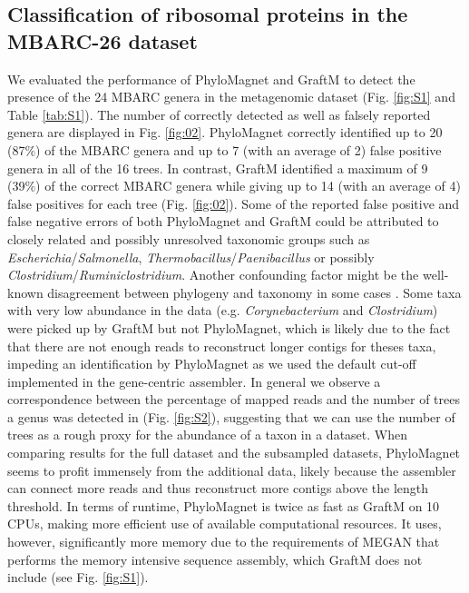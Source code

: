 \documentclass{bioinfo}
\begin{document}
\subsection{Classification of ribosomal proteins in the MBARC-26 dataset}

We evaluated the performance of PhyloMagnet and GraftM to detect the presence of the 24 MBARC genera \citep[23 of those detectable, as Nocardiopsis was part of the pooled community but not present in the sequence data from][]{Singer2016} in the metagenomic dataset (Fig. \ref{fig:S1} and Table \ref{tab:S1}). The number of correctly detected as well as falsely reported genera are displayed in Fig. \ref{fig:02}. PhyloMagnet correctly identified up to 20 (87\%) of the MBARC genera and up to 7 (with an average of 2) false positive genera in all of the 16 trees. In contrast, GraftM identified a maximum of 9 (39\%) of the correct MBARC genera while giving up to 14 (with an average of 4) false positives for each tree (Fig. \ref{fig:02}). Some of the reported false positive and false negative errors of both PhyloMagnet and GraftM could be attributed to closely related and possibly unresolved taxonomic groups such as \textit{Escherichia}/\textit{Salmonella}, \textit{Thermobacillus}/\textit{Paenibacillus} or possibly \textit{Clostridium}/\textit{Ruminiclostridium}. Another confounding factor might be the well-known disagreement between phylogeny and taxonomy in some cases \citep[e.g. \textit{Escherichia}/\textit{Salmonella};][]{Retchless2010}.  Some taxa with very low abundance in the data (e.g. \textit{Corynebacterium} and \textit{Clostridium}) were picked up by GraftM but not PhyloMagnet, which is likely due to the fact that there are not enough reads to reconstruct longer contigs for theses taxa, impeding an identification by PhyloMagnet as we used the default cut-off implemented in the gene-centric assembler. In general we observe a correspondence between the percentage of mapped reads \citep{Singer2016} and the number of trees a genus was detected in (Fig. \ref{fig:S2}), suggesting that we can use the number of trees as a rough proxy for the abundance of a taxon in a dataset.  
When comparing results for the full dataset and the subsampled datasets, PhyloMagnet seems to profit immensely from the additional data, likely because the assembler can connect more reads and thus reconstruct more contigs above the length threshold.
In terms of runtime, PhyloMagnet is twice as fast as GraftM on 10 CPUs, making more efficient use of available computational resources. It uses, however, significantly more memory due to the requirements of MEGAN that performs the memory intensive sequence assembly, which GraftM does not include (see Fig. \ref{fig:S1}).
\end{document}
